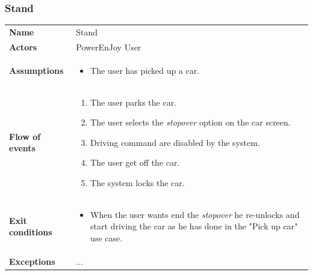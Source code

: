 \documentclass[english]{article}
\newcommand{\stopover}{\textit{stopover }}
\begin{document}
	\subsubsection{Stand}
	\begin{center}
	\begin{tabular}{l||p{10cm}}
	\textbf{Name} 
		& Stand\\ [8px]
	\textbf{Actors} 
		& PowerEnJoy User\\ [8px]
	\textbf{Assumptions} 
	& \begin{itemize}
		\item The user has picked up a car. 
	\end{itemize}\\
	\textbf{Flow of events}
		& \begin{enumerate}
 		\item The user parks the car.
 		\item The user selects the \stopover option on the car screen.
		\item Driving command are disabled by the system. 
		\item The user get off the car.
		\item The system locks the car.
		\end{enumerate}\\ 
	\textbf{Exit conditions}
		&\begin{itemize}
			\item When the user wants end the \stopover he re-unlocks and start driving the car as he has done in the "Pick up car" use case.
		\end{itemize}\\
	\textbf{Exceptions}
		& ...
	\end{tabular}
	\end{center}
	
\end{document}
